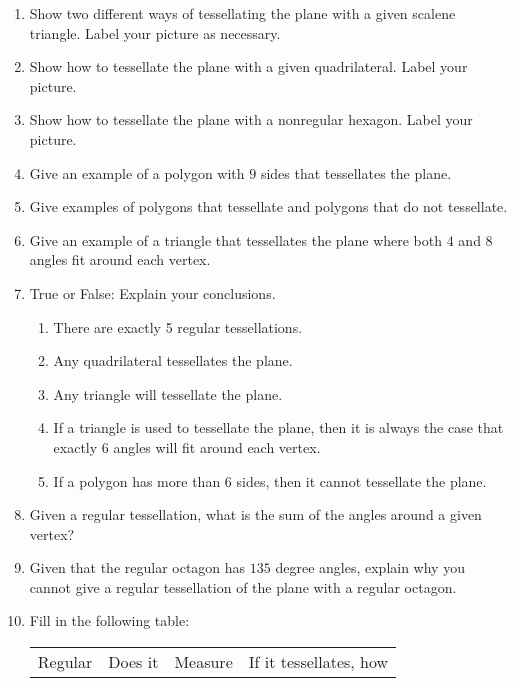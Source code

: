 


\begin{problems}

\begin{enumerate}
\item Show two different ways of tessellating the plane with a given scalene triangle. Label your picture as necessary.
\item Show how to tessellate the plane with a given quadrilateral. Label your picture.
\item Show how to tessellate the plane with a nonregular hexagon. Label your picture.
\item Give an example of a polygon with $9$ sides that tessellates the plane.
\item Give examples of polygons that tessellate and polygons that do
  not tessellate.
\item Give an example of a triangle that tessellates the plane where
  both $4$ and $8$ angles fit around each vertex.
\item True or False: Explain your conclusions.
\begin{enumerate}
\item There are exactly 5 regular tessellations.
\item Any quadrilateral tessellates the plane.
\item Any triangle will tessellate the plane.
\item If a triangle is used to tessellate the plane, then it is always
  the case that exactly $6$ angles will fit around each vertex.
\item If a polygon has more than 6 sides, then it cannot tessellate the plane.
\end{enumerate}
\item Given a regular tessellation, what is the sum of the angles
  around a given vertex?
\item Given that the regular octagon has $135$ degree angles, explain
  why you cannot give a regular tessellation of the plane with a
  regular octagon.
\item \label{tesstable} Fill in the following table:
\begin{center}
\begin{tabular}{|c || c| c| c|}\hline
 Regular & Does it      &  Measure & If it tessellates, how  \\

\end{tabular}
\end{center}
\end{enumerate}
\end{problems}
